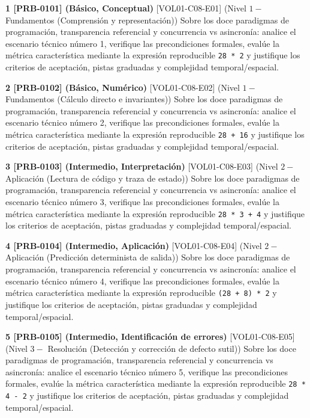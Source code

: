 \documentclass{book}
\begin{document}
\begin{tcolorbox}[title={Ejercicios}, studiumworked, breakable]

\noindent\textbf{1 [PRB-0101] (Básico, Conceptual)}
[VOL01-C08-E01] (Nivel \(1 -\) Fundamentos (Comprensión y representación)) Sobre los doce paradigmas de programación, transparencia referencial y concurrencia vs asincronía: analice el escenario técnico número 1, verifique las precondiciones formales, evalúe la métrica característica mediante la expresión reproducible \texttt{28 * 2} y justifique los criterios de aceptación, pistas graduadas y complejidad temporal/espacial.

\noindent\textbf{2 [PRB-0102] (Básico, Numérico)}
[VOL01-C08-E02] (Nivel \(1 -\) Fundamentos (Cálculo directo e invariantes)) Sobre los doce paradigmas de programación, transparencia referencial y concurrencia vs asincronía: analice el escenario técnico número 2, verifique las precondiciones formales, evalúe la métrica característica mediante la expresión reproducible \texttt{28 + 16} y justifique los criterios de aceptación, pistas graduadas y complejidad temporal/espacial.

\noindent\textbf{3 [PRB-0103] (Intermedio, Interpretación)}
[VOL01-C08-E03] (Nivel \(2 -\) Aplicación (Lectura de código y traza de estado)) Sobre los doce paradigmas de programación, transparencia referencial y concurrencia vs asincronía: analice el escenario técnico número 3, verifique las precondiciones formales, evalúe la métrica característica mediante la expresión reproducible \texttt{28 * 3 + 4} y justifique los criterios de aceptación, pistas graduadas y complejidad temporal/espacial.

\noindent\textbf{4 [PRB-0104] (Intermedio, Aplicación)}
[VOL01-C08-E04] (Nivel \(2 -\) Aplicación (Predicción determinista de salida)) Sobre los doce paradigmas de programación, transparencia referencial y concurrencia vs asincronía: analice el escenario técnico número 4, verifique las precondiciones formales, evalúe la métrica característica mediante la expresión reproducible \texttt{(28 + 8) * 2} y justifique los criterios de aceptación, pistas graduadas y complejidad temporal/espacial.

\noindent\textbf{5 [PRB-0105] (Intermedio, Identificación de errores)}
[VOL01-C08-E05] (Nivel \(3 -\) Resolución (Detección y corrección de defecto sutil)) Sobre los doce paradigmas de programación, transparencia referencial y concurrencia vs asincronía: analice el escenario técnico número 5, verifique las precondiciones formales, evalúe la métrica característica mediante la expresión reproducible \texttt{28 * 4 - 2} y justifique los criterios de aceptación, pistas graduadas y complejidad temporal/espacial.


\end{tcolorbox}
\end{document}
